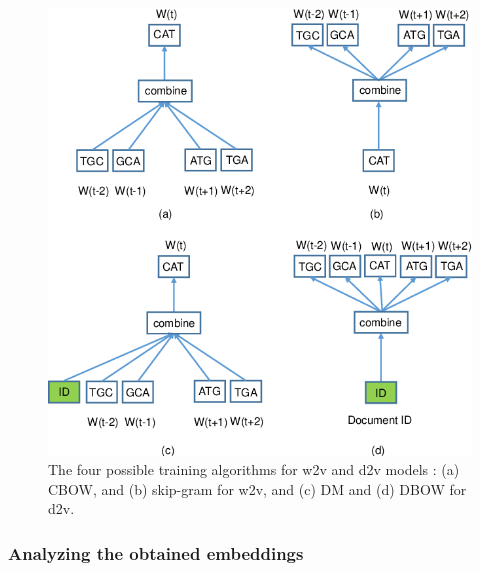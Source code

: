 \begin{figure}
	\centering\includegraphics[width=1\textwidth]{../visualizations/ch4-methods/w2v_d2v_training_variants.png} 
	\caption{
		The four possible training algorithms for w2v and d2v models \cite{d2vsplicing}: (a) CBOW, and (b) skip-gram for w2v, and (c) DM and (d) DBOW for d2v. 
	}
	\label{fig:w2vd2vtrainingvariants}
\end{figure}

\subsubsection{Analyzing the obtained embeddings}

